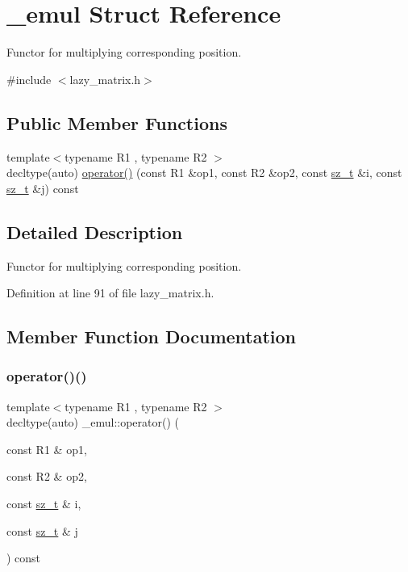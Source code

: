 \hypertarget{struct__emul}{}\section{\+\_\+emul Struct Reference}
\label{struct__emul}


Functor for multiplying corresponding position.  




{\ttfamily \#include $<$lazy\+\_\+matrix.\+h$>$}

\subsection*{Public Member Functions}
\begin{DoxyCompactItemize}
\item 
{\footnotesize template$<$typename R1 , typename R2 $>$ }\\decltype(auto) \mbox{\hyperlink{struct__emul_a63127e3e074de1340de840507eeb228d}{operator()}} (const R1 \&op1, const R2 \&op2, const \mbox{\hyperlink{lazy__matrix_8h_acba2745dcfc55b2d05ff45adc6a0a015}{sz\+\_\+t}} \&i, const \mbox{\hyperlink{lazy__matrix_8h_acba2745dcfc55b2d05ff45adc6a0a015}{sz\+\_\+t}} \&j) const
\end{DoxyCompactItemize}


\subsection{Detailed Description}
Functor for multiplying corresponding position. 

Definition at line 91 of file lazy\+\_\+matrix.\+h.



\subsection{Member Function Documentation}
\mbox{\label{struct__emul_a63127e3e074de1340de840507eeb228d}} 
\subsubsection{\texorpdfstring{operator()()}{operator()()}}
{\footnotesize\ttfamily template$<$typename R1 , typename R2 $>$ \\
decltype(auto) \+\_\+emul\+::operator() (\begin{DoxyParamCaption}\item[{const R1 \&}]{op1,  }\item[{const R2 \&}]{op2,  }\item[{const \mbox{\hyperlink{lazy__matrix_8h_acba2745dcfc55b2d05ff45adc6a0a015}{sz\+\_\+t}} \&}]{i,  }\item[{const \mbox{\hyperlink{lazy__matrix_8h_acba2745dcfc55b2d05ff45adc6a0a015}{sz\+\_\+t}} \&}]{j }\end{DoxyParamCaption}) const\hspace{0.3cm}{\ttfamily [inline]}}



